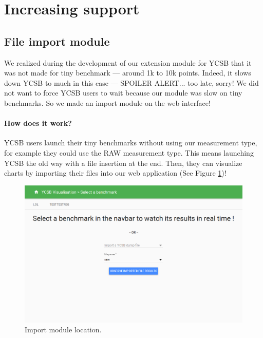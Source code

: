 \documentclass[a4paper,11pt]{report}
\begin{document}
\section{Increasing support}

\subsection{File import module}

We realized during the development of our extension module for YCSB that it was not made for tiny benchmark --- around 1k to 10k points. Indeed, it slows down YCSB to much in this case --- SPOILER ALERT... too late, sorry! We did not want to force YCSB users to wait because our module was slow on tiny benchmarks. So we made an import module on the web interface!

\paragraph{How does it work?}

YCSB users launch their tiny benchmarks without using our measurement type, for example they could use the RAW measurement type. This means launching YCSB the old way with a file insertion at the end. Then, they can visualize charts by importing their files into our web application (See Figure \ref{import_module})!

\begin{figure}[ht]
\begin{center}
\includegraphics[scale=0.35]{images/import_module.png}
\caption{Import module location.}
\label{import_module}
\end{center}
\end{figure}
\end{document}

